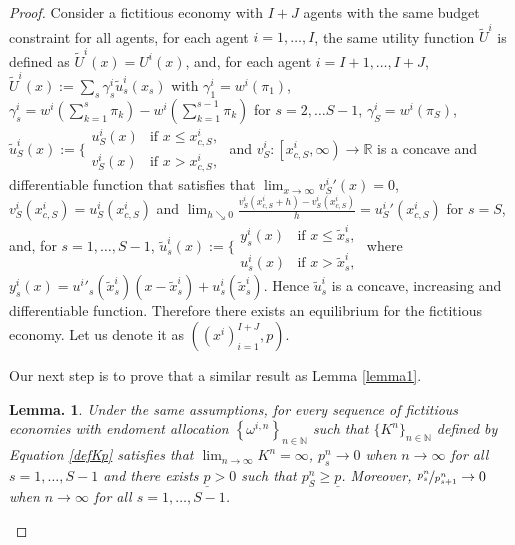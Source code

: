 \documentclass[pdftex]{article}
\numberwithin{equation}{section}
\theoremstyle{th}
\newtheorem{lemma}{{Lemma}.}%
\newtheorem{proof lemma}{{Proof Lemma}.}
\theoremstyle{definition}
\begin{document}
{\begin{proof}
Consider a fictitious economy with $I+J$ agents with the same budget
constraint for all agents, for each agent $i=1,\dots,I$, the same utility function $\tilde{U}^i$ is defined as $\tilde{U}^{i}(x)=U^{i}(x)$,
and, for each agent $i=I+1,\dots,I+J$, $\tilde{U}^{i}(x):=\sum_{s}\gamma_{s}^{i}\tilde{u}_{s}^{i}(x_{s})$
with $\gamma_{1}^{i}=w^{i}\left(\pi_{1}\right)$, $\gamma_{s}^{i}=w^{i}\left(\sum_{k=1}^{s}\pi_{k}\right)-w^{i}\left(\sum_{k=1}^{s-1}\pi_{k}\right)$
for $s=2,\dots S-1$, $\gamma_{S}^{i}=w^{i}\left(\pi_{S}\right)$,
$\tilde{u}_{S}^{i}(x):=\Bigg\{\begin{matrix}u^{i}_S(x) & \textrm{if }x\leq{x}_{c,S}^{i},\\
v^{i}_S(x) & \textrm{if }x>{x}_{c,S}^{i},
\end{matrix}$ and $v_{S}^{i}:\left[x_{c,S}^{i},\infty\right)\rightarrow\mathbb{R}$
is a concave and differentiable function that satisfies that $\lim_{x\rightarrow\infty}{v_{S}^{i}}'(x)=0$,
$v_{S}^{i}\left(x_{c,S}^{i}\right)=u^{i}_S\left(x_{c,S}^{i}\right)$ and
$\lim_{h\searrow0}\frac{v_{S}^{i}\left(x_{c,S}^{i}+h\right)-v_{S}^{i}\left(x_{c,S}^{i}\right)}{h}={u^{i}_S}'\left(x_{c,S}^{i}\right)$ for $s=S$,
and, for $s=1,\dots,S-1$, $\tilde{u}_{s}^{i}(x):=\Bigg\{\begin{matrix}y^{i}_s(x) & \textrm{if }x\leq\tilde{x}^{i}_s,\\
u^{i}_s(x) & \textrm{if }x>\tilde{x}^{i}_s,
\end{matrix}$ where $y^{i}_s(x)={u^{i}}'_s\left(\tilde{x}^{i}_s\right)\left(x-\tilde{x}^{i}_s\right)+u^{i}_s\left(\tilde{x}^{i}_s\right)$.
Hence $\tilde{u}_{s}^{i}$ is a concave, increasing and differentiable
function. Therefore there exists an equilibrium for the fictitious economy. Let
us denote it as $\left(\left(x^{i}\right)_{i=1}^{I+J},p\right)$. 

Our next step is to prove that a similar result as Lemma \ref{lemma1}. 

\begin{lemma} 

\label{lemma3} Under the same assumptions, for every sequence of fictitious economies with endoment allocation $\left\{\omega^{i,n}\right\}_{n\in\mathbb{N}}$ such that $\{K^n\}_{n\in\mathbb{N}}$ defined by Equation \ref{defKp} satisfies that $\lim_{n\rightarrow\infty}K^n=\infty$, $p^n_{s}\rightarrow0$
when $n\rightarrow\infty$ for all $s=1,\dots,S-1$ and there exists
$\underline{p}>0$ such that $p_{S}^{n}\geq\underline{p}$. Moreover,
$\nicefrac{p_{s}^{n}}{p_{s+1}^{n}}\rightarrow0$ when $n\rightarrow\infty$
for all $s=1,\dots,S-1$.


\end{lemma}
\end{proof}}
\end{document}
